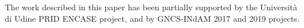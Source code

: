 The work described in this paper has been partially supported
 by the Università di Udine PRID ENCASE project, and by
GNCS-INdAM 2017 and 2019 projects.